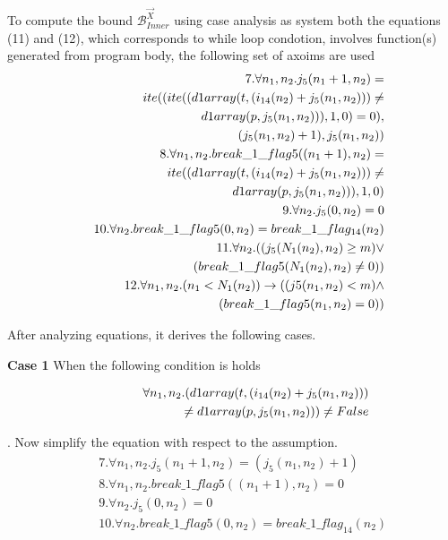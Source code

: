 To compute the bound $\mathcal{B}^{\vec{X}}_{Inner}$ using case analysis as system both the equations (11) and (12), which  corresponds to while loop condotion,  involves function(s) generated from program body, the following set of axoims are used 
\begin{eqnarray*}
	&&7.\forall n_1,n_2.j_5(n_1+1,n_2) =\\ &&\hspace*{2em}ite((ite((d1array(t,(i_{14}(n_2)+j_5(n_1,n_2)))\not=\\
	&&\hspace*{6em}d1array(p,j_5(n_1,n_2))),1,0)=0),\\
	&&\hspace*{9em}(j_5(n_1,n_2)+1),j_5(n_1,n_2))\\
	&&8.\forall n_1,n_2.break\_1\_flag5((n_1+1),n_2) =\\ &&\hspace*{4em}ite((d1array(t,(i_{14}(n_2)+j_5(n_1,n_2)))\not=\\
	&&\hspace*{9em}d1array(p,j_{5}(n_1,n_2))),1,0)\\
	&&9.\forall n_2.j_{5}(0,n_2) = 0\\
	&&10.\forall n_2.break\_1\_flag5(0,n_2) = break\_1\_flag_{14}(n_2)\\
	&&11.\forall n_2.((j_5(N_1(n_2),n_2)\geq m) \lor \\
	&&\hspace*{7em} (break\_1\_flag5(N_1(n_2),n_2)\not=0))\\
	&&12.\forall n_1,n_2.(n_1<N_1(n_2)) \rightarrow ((j5(n_1,n_2)<m) \land\\
	&&\hspace*{9em} (break\_1\_flag5(n_1,n_2)=0))
\end{eqnarray*}

After analyzing equations, it derives the following cases.


\textbf{Case 1} When the following condition is holds 

\begin{eqnarray*}
	&&\hspace*{-2em}\forall n_1,n_2.(d1array(t,(i_{14}(n_2)+j_5(n_1,n_2)))\\
	&&\hspace*{6em}\not=d1array(p,j_{5}(n_1,n_2)))\not= False 
\end{eqnarray*}

. Now simplify the equation with respect to the assumption.
\begin{eqnarray*}
	&&7.\forall n_1,n_2.j_5(n_1+1,n_2) = (j_5(n_1,n_2)+1)\\ 
	&&8.\forall n_1,n_2.break\_1\_flag5((n_1+1),n_2) =0\\ 
	&&9.\forall n_2.j_{5}(0,n_2) = 0\\
	&&10.\forall n_2.break\_1\_flag5(0,n_2) = break\_1\_flag_{14}(n_2)
\end{eqnarray*}

